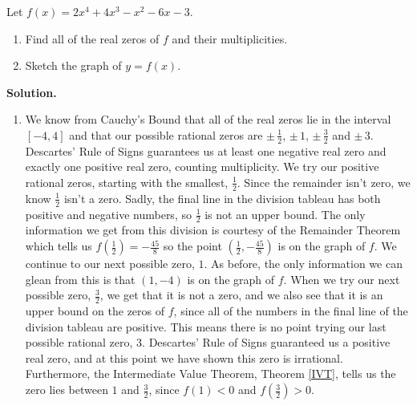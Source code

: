 \begin{ex}  Let $f(x) = 2x^4+4x^3-x^2-6x-3$.

\begin{enumerate}

\item  Find all of the real zeros of $f$ and their multiplicities.

\item Sketch the graph of $y=f(x)$.

\end{enumerate}  

{\bf Solution.}  \begin{enumerate}

\item  We know from Cauchy's Bound that all of the real zeros lie in the interval $[-4,4]$ and that our possible rational zeros are $\pm \, \frac{1}{2}$, $\pm \, 1$, $\pm \, \frac{3}{2}$ and $\pm \, 3$.  Descartes' Rule of Signs guarantees us at least one negative real zero and exactly one positive real zero, counting multiplicity.  We try our positive rational zeros, starting with the smallest, $\frac{1}{2}$.  Since the remainder isn't zero, we know $\frac{1}{2}$ isn't a zero.  Sadly, the final line in the division tableau has both positive and negative numbers, so $\frac{1}{2}$ is not an upper bound.  The only information we get from this division is courtesy of the Remainder Theorem which tells us $f\left(\frac{1}{2}\right) =  -\frac{45}{8}$ so the point $\left(\frac{1}{2}, -\frac{45}{8}\right)$ is on the graph of $f$.  We continue to our next possible zero, $1$.  As before, the only information we can glean from this is that $(1,-4)$ is on the graph of $f$.  When we try our next possible zero, $\frac{3}{2}$, we get that it is not a zero, and we also see that it is an upper bound on the zeros of $f$, since all of the numbers in the final line of the division tableau are positive.  This means there is no point trying our last possible rational zero, $3$.  Descartes' Rule of Signs guaranteed us a positive real zero, and at this point we have shown this zero is irrational.  Furthermore, the Intermediate Value Theorem, Theorem \ref{IVT}, tells us the zero lies between $1$ and $\frac{3}{2}$, since $f(1) < 0$ and $f\left(\frac{3}{2}\right) > 0$.   \smallskip

\end{enumerate}
\end{ex}
